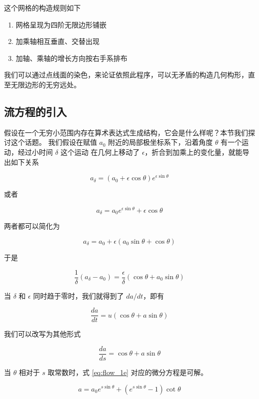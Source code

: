 \documentclass[a4paper,12pt]{article}
\numberwithin{definition}{section}
\numberwithin{lemma}{section}
\numberwithin{proposition}{section}
\numberwithin{theorem}{section}
\numberwithin{grammar}{section}
\numberwithin{program}{section}
\numberwithin{convention}{section}
\numberwithin{corollary}{section}
\begin{document}
这个网格的构造规则如下
\begin{enumerate}
    \item 网格呈现为四阶无限边形铺嵌
    \item 加乘轴相互垂直、交替出现
    \item 加轴、乘轴的增长方向按右手系排布
\end{enumerate}

我们可以通过点线面的染色，来论证依照此程序，可以无矛盾的构造几何构形，直至无限边形的无穷远处。

\subsection{流方程的引入}\label{subsec:flow}

假设在一个无穷小范围内存在算术表达式生成结构，它会是什么样呢？本节我们探讨这个话题。
我们假设在赋值 $a_0$ 附近的局部极坐标系下，沿着角度 $\theta$ 有一个运动，经过小时间 $\delta$ 这个运动
在几何上移动了 $\epsilon$，折合到加乘上的变化量，就能导出如下关系

\begin{equation}
    a_{\delta} = (a_0 + \epsilon \cos \theta)e^{\epsilon \sin \theta}
\end{equation}

或者

\begin{equation}
    a_{\delta} = a_0 e^{\epsilon \sin \theta} + \epsilon \cos \theta
\end{equation}

两者都可以简化为

$$
    a_{\delta} = a_0 + \epsilon (a_0 \sin \theta + \cos \theta)
$$

于是

$$
    \frac{1}{\delta} (a_{\delta} - a_0) = \frac{\epsilon}{\delta} (\cos \theta + a_0 \sin \theta)
$$

当 $\delta$ 和 $\epsilon$ 同时趋于零时，我们就得到了 $da / dt$，即有

$$
    \frac{da}{dt} = u (\cos \theta + a \sin \theta)
$$

我们可以改写为其他形式

\begin{equation}
    \frac{da}{ds} = \cos \theta + a \sin \theta \label{eq:flow_1e}
\end{equation}

当 $\theta$ 相对于 $s$ 取常数时，式 \eqref{eq:flow_1e} 对应的微分方程是可解。

\begin{equation}
   a = a_0 e^{s \sin \theta} + (e^{s \sin \theta} - 1) \cot \theta
\end{equation}
\end{document}
